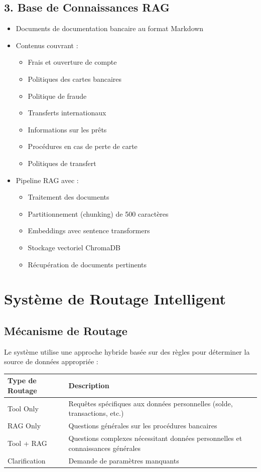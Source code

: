 \documentclass[12pt,a4paper]{article}
\begin{document}
\subsection*{3. Base de Connaissances RAG}
\begin{itemize}
    \item Documents de documentation bancaire au format Markdown
    \item Contenus couvrant :
    \begin{itemize}
        \item Frais et ouverture de compte
        \item Politiques des cartes bancaires
        \item Politique de fraude
        \item Transferts internationaux
        \item Informations sur les prêts
        \item Procédures en cas de perte de carte
        \item Politiques de transfert
    \end{itemize}
    \item Pipeline RAG avec :
    \begin{itemize}
        \item Traitement des documents
        \item Partitionnement (chunking) de 500 caractères
        \item Embeddings avec sentence transformers
        \item Stockage vectoriel ChromaDB
        \item Récupération de documents pertinents
    \end{itemize}
\end{itemize}

\section*{Système de Routage Intelligent}

\subsection*{Mécanisme de Routage}
Le système utilise une approche hybride basée sur des règles pour déterminer la source de données appropriée :

\begin{center}
\begin{tabular}{|l|l|}
\hline
\textbf{Type de Routage} & \textbf{Description} \\
\hline
Tool Only & Requêtes spécifiques aux données personnelles (solde, transactions, etc.) \\
RAG Only & Questions générales sur les procédures bancaires \\
Tool + RAG & Questions complexes nécessitant données personnelles et connaissances générales \\
Clarification & Demande de paramètres manquants \\
\hline
\end{tabular}
\end{center}
\end{document}
